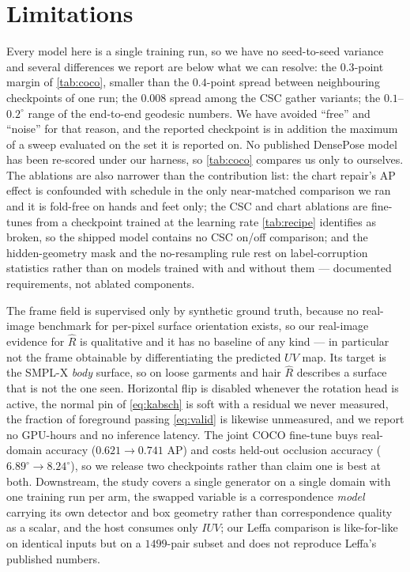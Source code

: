 \section{Limitations}
\label{sec:limitations}

Every model here is a single training run, so we have no seed-to-seed variance and several
differences we report are below what we can resolve: the $0.3$-point margin of \cref{tab:coco},
smaller than the $0.4$-point spread between neighbouring checkpoints of one run; the $0.008$ spread
among the CSC gather variants; the $0.1$--$0.2^\circ$ range of the end-to-end geodesic numbers. We
have avoided ``free'' and ``noise'' for that reason, and the reported checkpoint is in addition the
maximum of a sweep evaluated on the set it is reported on. No published DensePose model has been
re-scored under our harness, so \cref{tab:coco} compares us only to ourselves. The ablations are
also narrower than the contribution list: the chart repair's AP effect is confounded with schedule
in the only near-matched comparison we ran and it is fold-free on hands and feet only; the CSC and
chart ablations are fine-tunes from a checkpoint trained at the learning rate \cref{tab:recipe}
identifies as broken, so the shipped model contains no CSC on/off comparison; and the
hidden-geometry mask and the no-resampling rule rest on label-corruption statistics rather than on
models trained with and without them --- documented requirements, not ablated components.

The frame field is supervised only by synthetic ground truth, because no real-image benchmark for
per-pixel surface orientation exists, so our real-image evidence for $\hat R$ is qualitative and it
has no baseline of any kind --- in particular not the frame obtainable by differentiating the
predicted $UV$ map. Its target is the SMPL-X \emph{body} surface, so on loose garments and hair
$\hat R$ describes a surface that is not the one seen. Horizontal flip is disabled whenever the
rotation head is active, the normal pin of \cref{eq:kabsch} is soft with a residual we never
measured, the fraction of foreground passing \cref{eq:valid} is likewise unmeasured, and we report
no GPU-hours and no inference latency. The joint COCO fine-tune buys real-domain accuracy
($0.621\!\rightarrow\!0.741$ AP) and costs held-out occlusion accuracy
($6.89^\circ\!\rightarrow\!8.24^\circ$), so we release two checkpoints rather than claim one is
best at both. Downstream, the study covers a single generator on a single domain with one training
run per arm, the swapped variable is a correspondence \emph{model} carrying its own detector and
box geometry rather than correspondence quality as a scalar, and the host consumes only $IUV$; our
Leffa comparison is like-for-like on identical inputs but on a $1499$-pair subset and does not
reproduce Leffa's published numbers.

